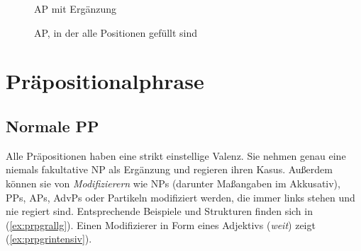 \begin{figure}[!htbp]
  \centering
  \caption{AP mit Ergänzung}
  \label{fig:erginadjgr}
\end{figure}

\begin{figure}[!htbp]
  \centering
  \caption{AP, in der alle Positionen gefüllt sind}
  \label{fig:adjgrziemlichvoll}
\end{figure}




\section{Präpositionalphrase}

\label{sec:prpgr}

\subsection{Normale PP}



Alle Präpositionen haben eine strikt einstellige Valenz.
Sie nehmen genau eine niemals fakultative NP als Ergänzung und regieren ihren Kasus.
Außerdem können sie von \textit{Modifizierern} wie NPs (darunter Maßangaben im Akkusativ), PPs, APs, AdvPs oder Partikeln modifiziert werden, die immer links stehen und nie regiert sind.
Entsprechende Beispiele und Strukturen finden sich in (\ref{ex:prpgrallg}).
Einen Modifizierer in Form eines Adjektivs (\textit{weit}) zeigt (\ref{ex:prpgrintensiv}).

